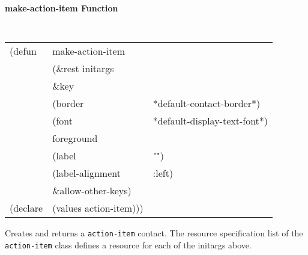 
{\samepage
{\large {\bf make-action-item \hfill Function}} 
\begin{flushright} \parbox[t]{6.125in}{
\tt
\begin{tabular}{lll}
\raggedright
(defun & make-action-item \\
       & (\&rest initargs \\
       & \&key  \\
       & (border                & *default-contact-border*) \\ 
       & (font                  & *default-display-text-font*) \\ 
       & foreground \\
       & (label                 & "") \\  
       & (label-alignment       & :left) \\  
       &   \&allow-other-keys) \\
(declare & (values   action-item)))
\end{tabular}
\rm

}\end{flushright}}

\begin{flushright} \parbox[t]{6.125in}{
Creates and returns a {\tt action-item} contact.
The resource specification list of the {\tt action-item} class defines
a resource for each of the initargs above.


}\end{flushright}


